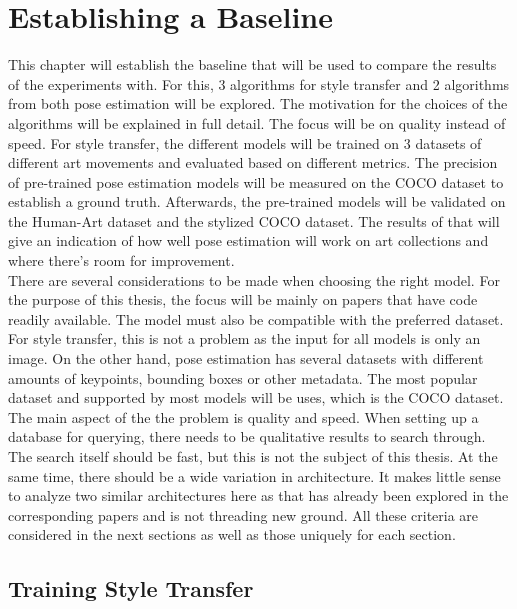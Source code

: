 \graphicspath{{images/chapter2/}}

\chapter{Establishing a Baseline}
\label{chap:baseline}
This chapter will establish the baseline that will be used to compare the results of the experiments with.
For this, 3 algorithms for style transfer and 2 algorithms from both pose estimation will be explored.
The motivation for the choices of the algorithms will be explained in full detail.
The focus will be on quality instead of speed.
For style transfer, the different models will be trained on 3 datasets of different art movements and evaluated based on different metrics.
The precision of pre-trained pose estimation models will be measured on the COCO dataset to establish a ground truth.
Afterwards, the pre-trained models will be validated on the Human-Art dataset and the stylized COCO dataset.
The results of that will give an indication of how well pose estimation will work on art collections and where there's room for improvement.
\\

There are several considerations to be made when choosing the right model.
For the purpose of this thesis, the focus will be mainly on papers that have code readily available.
The model must also be compatible with the preferred dataset.
For style transfer, this is not a problem as the input for all models is only an image.
On the other hand, pose estimation has several datasets with different amounts of keypoints, bounding boxes or other metadata.
The most popular dataset and supported by most models will be uses, which is the COCO dataset.
The main aspect of the the problem is quality and speed.
When setting up a database for querying, there needs to be qualitative results to search through.
The search itself should be fast, but this is not the subject of this thesis.
At the same time, there should be a wide variation in architecture.
It makes little sense to analyze two similar architectures here as that has already been explored in the corresponding papers and is not threading new ground.
All these criteria are considered in the next sections as well as those uniquely for each section.

\section{Training Style Transfer}
\label{sec:baseline_style_transfer}

